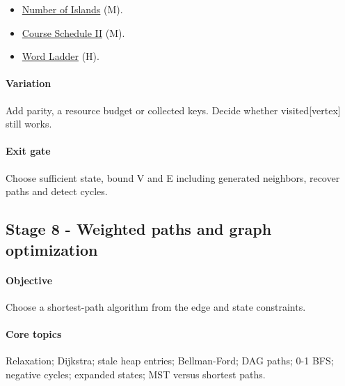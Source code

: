 \documentclass[11pt,letterpaper]{article}
\begin{document}
\begin{itemize}

\item \href{https://leetcode.com/problems/number-of-islands/}{Number of Islands} (M).

\item \href{https://leetcode.com/problems/course-schedule-ii/}{Course Schedule II} (M).

\item \href{https://leetcode.com/problems/word-ladder/}{Word Ladder} (H).

\end{itemize}

\paragraph*{Variation}

Add parity, a resource budget or collected keys. Decide whether visited[vertex] still works.

\paragraph*{Exit gate}

Choose sufficient state, bound V and E including generated neighbors, recover paths and detect cycles.

\par{}
\begin{samepage}
\section{Stage 8 - Weighted paths and graph optimization}\label{sec:12}

\label{stage:8}


\paragraph*{Objective}

Choose a shortest-path algorithm from the edge and state constraints.

\end{samepage}

\paragraph*{Core topics}

Relaxation; Dijkstra; stale heap entries; Bellman-Ford; DAG paths; 0-1 BFS; negative cycles; expanded states; MST versus shortest paths.
\end{document}
